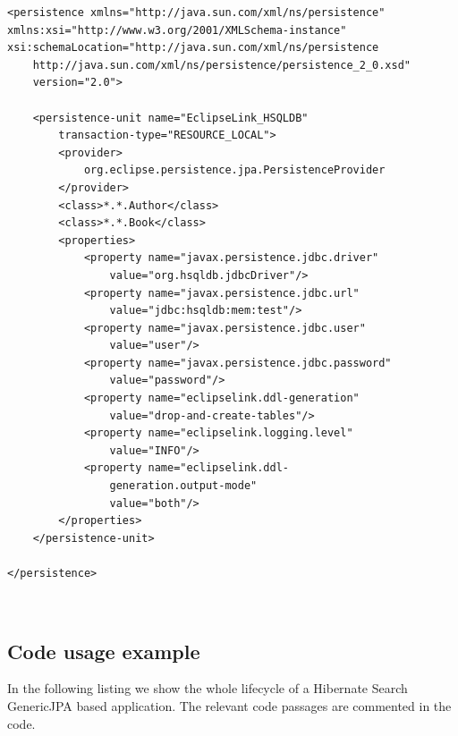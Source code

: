 \lstset{language=xml}
\begin{lstlisting}[frame=htrbl, caption={Complete persistence.xml}, label={lst:persistence.xml_complete}]
<persistence xmlns="http://java.sun.com/xml/ns/persistence"
xmlns:xsi="http://www.w3.org/2001/XMLSchema-instance"
xsi:schemaLocation="http://java.sun.com/xml/ns/persistence
	http://java.sun.com/xml/ns/persistence/persistence_2_0.xsd"
	version="2.0">

	<persistence-unit name="EclipseLink_HSQLDB"
		transaction-type="RESOURCE_LOCAL">
		<provider>
			org.eclipse.persistence.jpa.PersistenceProvider
		</provider>
		<class>*.*.Author</class>
		<class>*.*.Book</class>
		<properties>
			<property name="javax.persistence.jdbc.driver"
				value="org.hsqldb.jdbcDriver"/>
			<property name="javax.persistence.jdbc.url"
				value="jdbc:hsqldb:mem:test"/>
			<property name="javax.persistence.jdbc.user"
				value="user"/>
			<property name="javax.persistence.jdbc.password"
				value="password"/>
			<property name="eclipselink.ddl-generation"
				value="drop-and-create-tables"/>
			<property name="eclipselink.logging.level"
				value="INFO"/>
			<property name="eclipselink.ddl-
				generation.output-mode"
				value="both"/>
		</properties>
	</persistence-unit>
	
</persistence>
\end{lstlisting}

\pagebreak
~
\pagebreak

\subsection{Code usage example}

In the following listing we show the whole lifecycle of a Hibernate Search GenericJPA based application. The relevant code passages are commented in the code.
\\

